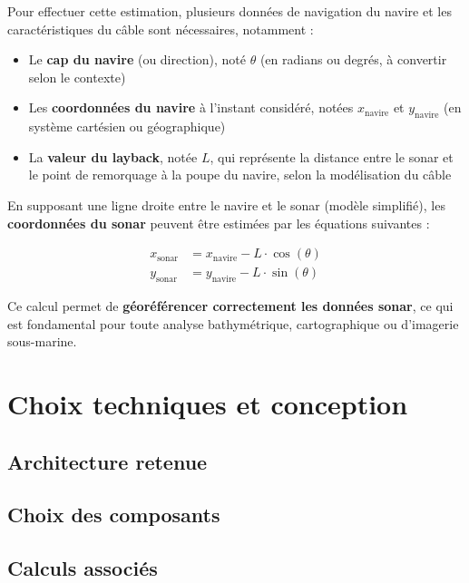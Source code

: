 \documentclass[12pt,a4paper]{report}
\begin{document}
Pour effectuer cette estimation, plusieurs données de navigation du navire et les caractéristiques du câble sont
nécessaires, notamment :

\begin{itemize}
  \item Le \textbf{cap du navire} (ou direction), noté $\theta$ (en radians ou degrés, à convertir selon le contexte)
  \item Les \textbf{coordonnées du navire} à l’instant considéré, notées $x_{\text{navire}}$ et $y_{\text{navire}}$
  (en système cartésien ou géographique)
  \item La \textbf{valeur du layback}, notée $L$, qui représente la distance entre le sonar et le point de remorquage à
  la poupe du navire, selon la modélisation du câble
\end{itemize}

En supposant une ligne droite entre le navire et le sonar (modèle simplifié), les \textbf{coordonnées du sonar} peuvent
être estimées par les équations suivantes :


\begin{align*}
    x_{\text{sonar}} &= x_{\text{navire}} - L \cdot \cos(\theta) \\
    y_{\text{sonar}} &= y_{\text{navire}} - L \cdot \sin(\theta)
\end{align*}


Ce calcul permet de \textbf{géoréférencer correctement les données sonar}, ce qui est fondamental pour toute analyse
bathymétrique, cartographique ou d'imagerie sous-marine.



\section{Choix techniques et conception}

\subsection{Architecture retenue}
\subsection{Choix des composants}
\subsection{Calculs associés}
\end{document}
